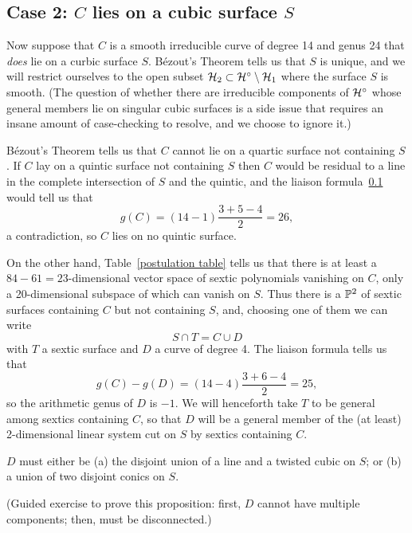 \subsection{Case 2: $C$ lies on a cubic surface $S$}

Now suppose that $C$ is a smooth irreducible curve of degree 14 and genus 24 that \emph{does} lie on a curbic surface $S$. B\'ezout's Theorem tells us that  $S$  is unique, and we will restrict ourselves to the open subset ${\cal H}_2 \subset {\cal H}^\circ \setminus {\cal H}_1$ where the surface $S$ is smooth.  (The question of whether there are irreducible components of ${\cal H}^\circ$ whose general members lie on singular cubic surfaces is a side issue that requires an insane amount of case-checking to resolve, and we choose to ignore it.) 

B\'ezout's Theorem tells us that $C$ cannot lie on a quartic surface not containing $S$. If $C$ lay on a quintic surface not containing $S$ then $C$ would be residual to a line in the complete intersection of $S$ and the quintic, and the liaison formula~\ref{} would tell us that 
$$
g(C) = (14-1)\frac{3+5-4}{2} = 26,
$$
a contradiction, so $C$ lies on no quintic surface.

On the other hand, Table~\ref{postulation table} tells us that there is at least a $84-61 = 23$-dimensional vector space of sextic polynomials vanishing on  $C$, only a 20-dimensional subspace of which can vanish on $S$. Thus there is a ${\mathbb P}^2$ of sextic surfaces containing $C$ but not containing $S$, and, choosing one of them we can write
$$
S \cap T = C \cup D
$$
with $T$ a sextic surface and $D$ a curve of degree 4. The liaison formula  tells us that
$$
g(C) - g(D) = (14 - 4)\frac{3+6-4}{2} = 25,
$$
so the arithmetic genus of $D$ is $-1$. We will henceforth take $T$ to be general among sextics containing $C$, so that $D$ will be a general member of the (at least) 2-dimensional linear system cut on $S$ by sextics containing $C$.

\begin{proposition}\label {2a,b}
$D$ must either be (a) the disjoint union of a line and a twisted cubic on $S$; or (b) a union of two disjoint conics on $S$. 
\end{proposition}

\begin{exercise}\label{character of D}
(Guided exercise to prove this proposition: first, $D$ cannot have multiple components; then, must be disconnected.)
\end{exercise}

